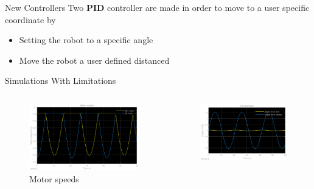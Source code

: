 \documentclass{beamer}
\begin{document}


\begin{frame}{New Controllers}
Two \textbf{PID} controller are made in order to move to a user specific coordinate by
\begin{itemize}
    \item Setting the robot to a specific angle
    \item Move the robot a user defined distanced
\end{itemize}
\end{frame}







\begin{frame}{Simulations With Limitations}
\begin{columns}
\begin{column}[]{0.5\textwidth}
\begin{figure}
    \centering
    \includegraphics[width=\textwidth]{img/motor_speeds.eps}
    \caption{Motor speeds}
    \label{fig:my_label}
\end{figure}
\end{column}
\begin{column}[]{0.5\textwidth}
\begin{figure}
    \centering
    \includegraphics[width=\textwidth]{img/comparison.eps}

\end{figure}
\end{column}
\end{columns}
\end{frame}
\end{document}

